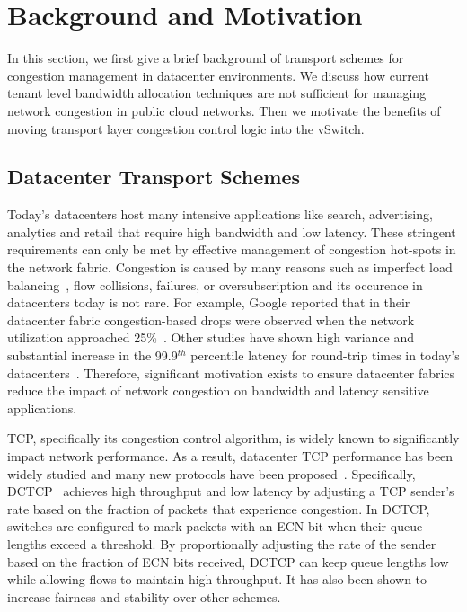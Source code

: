 \section{Background and Motivation}
\label{background}
In this section, we first give a brief background of transport schemes for
 congestion management in datacenter environments. We discuss how current 
tenant level bandwidth allocation techniques are not sufficient for managing network 
congestion in public cloud networks. Then we motivate the benefits of moving transport 
layer congestion control logic into the vSwitch. 


\subsection{Datacenter Transport Schemes}

 Today's datacenters host many intensive applications like search, advertising, analytics
and retail that require high bandwidth and low latency. These stringent requirements can
only be met by effective management of congestion hot-spots in the network fabric.
Congestion is caused by many reasons such as imperfect load balancing~\cite{al2010hedera},
flow collisions, failures, or oversubscription and its occurence in datacenters today is 
not rare. For example, Google reported that in their datacenter fabric congestion-based 
drops were observed when the network utilization approached 25\%~\cite{singh2015jupiter}.
Other studies have shown high variance and substantial increase in the 99.9$^{th}$ percentile latency for round-trip times in today's datacenters~\cite{wang2010impact,mogul2015inferring}. Therefore, significant motivation exists to ensure datacenter fabrics reduce the 
impact of network congestion on bandwidth and latency sensitive applications.

TCP, specifically its congestion control algorithm, is widely known to significantly 
impact network performance. As a result, datacenter TCP performance has been widely
studied and many new protocols have been proposed~\cite{alizadeh2011data, stephens2014practical, wu2010ictcp, mittal2015timely, jose2015high}. Specifically, DCTCP~\cite{alizadeh2011data} achieves high throughput and low latency by adjusting a TCP sender's rate based on
the fraction of packets that experience congestion. In DCTCP, switches are configured to 
mark packets with an ECN bit when their queue lengths exceed a threshold. By 
proportionally adjusting the rate of the sender based on the fraction of ECN bits 
received, DCTCP can keep queue lengths low while allowing flows to maintain high 
throughput. It has also been shown to increase fairness and stability over other schemes.
~ 

